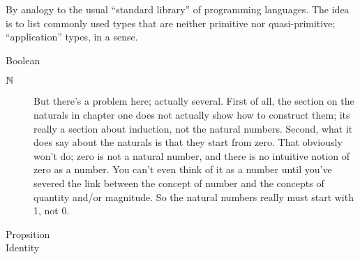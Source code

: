 \begin{remark}
  By analogy to the usual ``standard library'' of programming
  languages.  The idea is to list commonly used types that are neither
  primitive nor quasi-primitive; ``application'' types, in a sense.
\end{remark}


\begin{description}
\item [Boolean] \citep[p. 34]{hottbook}
\item [$\mathbb{N}$] \citep[p. 36]{hottbook} But there's a problem here;
  actually several.  First of all, the section on the naturals in
  chapter one does not actually show how to construct them; its really
  a section about induction, not the natural numbers.  Second, what it
  does say about the naturals is that they start from zero.  That
  obviously won't do; zero is not a natural number, and there is no
  intuitive notion of zero as a number.  You can't even think of it as
  a number until you've severed the link between the concept of number
  and the concepts of quantity and/or magnitude.  So the natural
  numbers really must start with 1, not 0.
\item [Propsition]
\item [Identity] 
\end{description}

